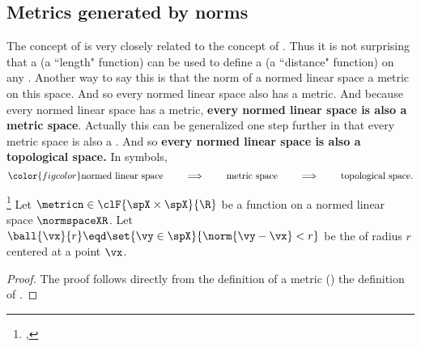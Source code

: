 \subsection{Metrics generated by norms}
The concept of  is very closely related to the concept of .
Thus it is not surprising that a  (a ``length" function)
can be used to define a  (a ``distance" function)
on any  .
Another way to say this is that the norm of a normed linear space
 a metric on this space.
And %
so every normed linear space also has a metric.
And because every normed linear space has a metric,
{\bf every normed linear space is also a metric space}.
Actually this can be generalized one step further in that
every metric space is also a .
And so {\bf every normed linear space is also a topological space.}
In symbols,
\[ \color{figcolor}
   \text{normed linear space}
   \qquad\implies\qquad
   \text{metric space}
   \qquad\implies\qquad
   \text{topological space}.
\]
\begin{theorem}
\label{thm:d=norm}
\footnote{
  ,
  }
Let $\metricn\in\clF{\spX\times\spX}{\R}$ be a function on a  normed linear space $\normspaceXR$.
Let $\ball{\vx}{r}\eqd\set{\vy\in\spX}{\norm{\vy-\vx}<r}$ be the  of radius $r$ centered at a point $\vx$.
\end{theorem}
\begin{proof}
The proof follows directly from the definition of a metric ()
the definition of  .
\end{proof}


